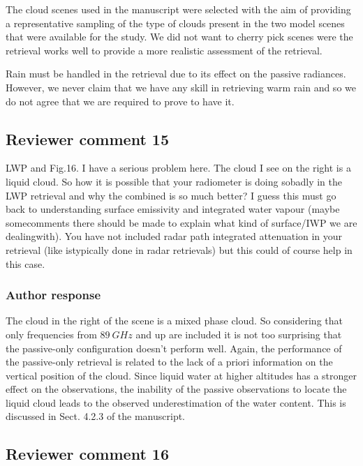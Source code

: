 \documentclass[11pt]{scrartcl}
\begin{document}
The cloud scenes used in the manuscript were selected with the aim of providing
a representative sampling of the type of clouds present in the two model scenes that
were available for the study. We did not want to cherry pick scenes were the
retrieval works well to provide a more realistic assessment of  the retrieval.

Rain must be handled in the retrieval due to its effect on the passive
radiances. However, we never claim that we have any skill in retrieving warm
rain and so we do not agree that we are required to prove to have it.

\subsection*{Reviewer comment 15}

 LWP and Fig.16. I have a serious problem here. The cloud I see on the right is a
 liquid cloud. So how it is possible that your radiometer is doing sobadly in
 the LWP retrieval and why the combined is so much better? I guess this must go
 back to understanding surface emissivity and integrated water vapour (maybe
 somecomments there should be made to explain what kind of surface/IWP we are
 dealingwith). You have not included radar path integrated attenuation in your
 retrieval (like istypically done in radar retrievals) but this could of course
 help in this case.

\subsubsection*{Author response}

The cloud in the right of the scene is a mixed phase cloud. So considering that
only frequencies from $89\ \unit{GHz}$ and up are included it is not too
surprising that the passive-only configuration doesn't perform well. Again, the
performance of the passive-only retrieval is related to the lack of a priori
information on the vertical position of the cloud. Since liquid water at higher
altitudes has a stronger effect on the observations, the inability of the
passive observations to locate the liquid cloud leads to the observed
underestimation of the water content. This is discussed in Sect. 4.2.3 of the
manuscript.

\subsection*{Reviewer comment 16}
\end{document}

